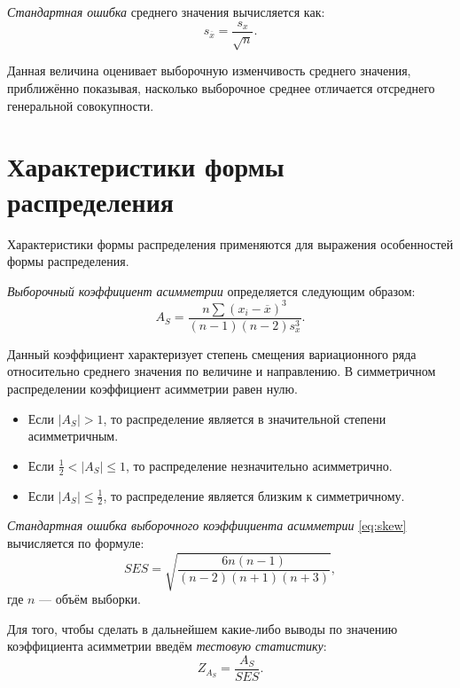 \textit{Стандартная ошибка} среднего значения вычисляется как:
\begin{equation*}
	s_{\overline{x}} = \frac{s_x}{\sqrt{n}}.
\end{equation*}

Данная величина оценивает выборочную изменчивость среднего значения, приближённо показывая, насколько выборочное среднее отличается отсреднего генеральной совокупности.


\section*{Характеристики формы распределения} %
\label{sec:chars_distr}

Характеристики формы распределения применяются для выражения особенностей формы распределения.

\textit{Выборочный коэффициент асимметрии} определяется следующим образом:
\begin{equation}
\label{eq:skew}
	A_S = \frac{n\sum{(x_i - \overline{x})^3}}{(n - 1)(n - 2)s_x^3}.
\end{equation}

Данный коэффициент характеризует степень смещения вариационного ряда относительно среднего значения по величине и направлению. В симметричном распределении коэффициент асимметрии равен нулю. 
\begin{itemize}
	\item Если $\vert A_S \vert > 1$, то распределение является в значительной степени асимметричным. 
	\item Если $\frac{1}{2} < \vert A_S \vert \le 1$, то распределение незначительно асимметрично. 
	\item Если $\vert A_S \vert \le \frac{1}{2}$, то распределение является близким к симметричному.
\end{itemize}

\textit{Стандартная ошибка выборочного коэффициента асимметрии} \eqref{eq:skew} вычисляется по формуле:
\begin{equation*}
	SES= \sqrt{\frac{6n(n - 1)}{(n - 2)(n + 1)(n + 3)}},
\end{equation*}
где $n$ --- объём выборки.

Для того, чтобы сделать в дальнейшем какие-либо выводы по значению коэффициента асимметрии введём \textit{тестовую статистику}: 
\begin{equation*}
	Z_{A_S}=\frac{A_S}{SES}.
\end{equation*}

